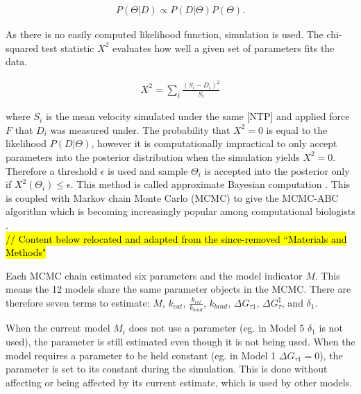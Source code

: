 \documentclass[10pt,letterpaper]{article}
\begin{document}
\begin{eqnarray}
    P(\Theta | D) \propto P(D | \Theta) P(\Theta).
\end{eqnarray}

As there is no easily computed likelihood function, simulation is used. The chi-squared test statistic $X^2$  evaluates how well a given set of parameters fits the data.

\begin{eqnarray}
    X^2 = \sum\limits_{i} \frac{(S_i - D_i)^2}{S_i}
\end{eqnarray}

where $S_i$ is the mean velocity simulated under the same [NTP] and applied force $F$ that $D_i$ was measured under. The probability that $X^2=0$ is equal to the likelihood $P(D | \Theta)$, however it is computationally impractical to only accept parameters into the posterior distribution when the simulation yields $X^2=0$. Therefore a threshold $\epsilon$ is used and sample $\Theta_i$ is accepted into the posterior only if $X^2(\Theta_i) \leq \epsilon$. This method is called approximate Bayesian computation \cite{beaumont2010approximate, csillery2010approximate}. This is coupled with Markov chain Monte Carlo (MCMC) to give the MCMC-ABC algorithm which is becoming increasingly popular among computational biologists \cite{beaumont2010approximate, ratmann2007using}.  \\


\hl{// Content below relocated and adapted from the since-removed ``Materials and Methods"}




Each MCMC chain estimated six parameters and the model indicator $M$. This means the 12 models share the same parameter objects in the MCMC. There are therefore seven terms to estimate: $M$, $k_{cat}$, $\frac{k_{rel}}{k_{bind}}$, $k_{bind}$, $\Delta G_{\tau 1}$, $\Delta G^\ddag_\tau$, and $\delta_1$.


When the current model $M_i$ does not use a parameter (eg. in Model 5 $\delta_1$ is not used), the parameter is still estimated even though it is not being used. When the model requires a parameter to be held constant (eg. in Model 1 $\Delta G_{\tau 1} = 0$), the parameter is set to its constant during the simulation. This is done without affecting or being affected by its current estimate, which is used by other models.


\end{document}
